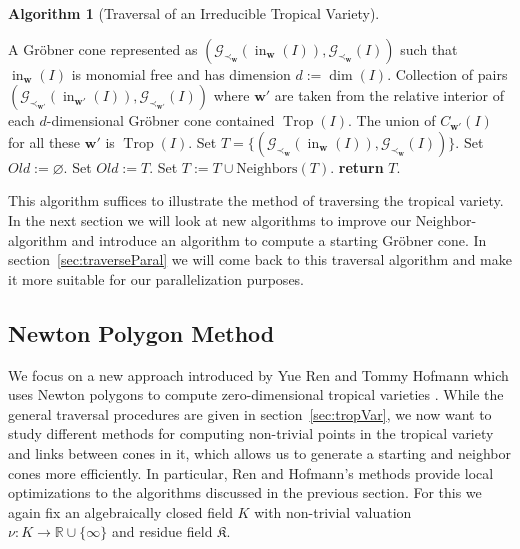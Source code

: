 \documentclass[
  paper=a4,
  titlepage,
  bibliography=totoc,
  listof=totoc,
  pagesize=pdftex
]{scrartcl}
\numberwithin{figure}{section}
\numberwithin{equation}{section}
\numberwithin{table}{section}
\newcommand*\setR{\mathds{R}}
\let\vec\mathbf
\DeclareMathOperator{\Trop}{Trop}
\DeclareMathOperator{\initial}{in}
\theoremstyle{definition}
\newtheorem{algo}[definition]{Algorithm}
\numberwithin{definition}{section}
\begin{document}
\begin{algo}[Traversal of an Irreducible Tropical Variety]\
  \label{alg:traversal}
  \begin{algorithmic}[1]
    \Require A Gröbner cone represented as $(\mathcal G_{\prec_{\vec w}}(\initial_{\vec
      w}(I)), \mathcal G_{\prec_{\vec w}}(I))$ such that $\initial_{\vec w}(I)$ is
      monomial free and has dimension $d:=\dim(I)$.
    \Ensure Collection of pairs $(\mathcal G_{\prec_{\vec w'}}(\initial_{\vec
      w'}(I)), \mathcal G_{\prec_{\vec w'}}(I))$ where $\vec w'$ are taken from the
      relative interior of each $d$-dimensional Gröbner cone contained $\Trop(I)$. The
      union of $C_{\vec w'}(I)$ for all these $\vec w'$ is $\Trop(I)$.
    \State Set $T = \{ (\mathcal G_{\prec_{\vec w}}(\initial_{\vec
      w}(I)), \mathcal G_{\prec_{\vec w}}(I)) \}$.
    \State Set $Old := \varnothing$.
      \State Set $Old := T$.
      \State Set $T := T \cup \mathrm{Neighbors}(T)$.
    \EndWhile
    \State\textbf{return} $T$.
  \end{algorithmic}
\end{algo}

This algorithm suffices to illustrate the method of traversing the tropical variety. In
the next section we will look at new algorithms to improve our Neighbor-algorithm and
introduce an algorithm to compute a starting Gröbner cone. In
section~\ref{sec:traverseParal} we will come back to this traversal algorithm and make it
more suitable for our parallelization purposes.

\subsection{Newton Polygon Method}
\label{sec:newtonMethod}

We focus on a new approach introduced by Yue Ren and Tommy Hofmann which uses Newton
polygons to compute zero-dimensional tropical varieties \cite{tropPointsLinks}. While the
general traversal procedures are given in section~\ref{sec:tropVar}, we now want to study
different methods for computing non-trivial points in the tropical variety and links
between cones in it, which allows us to generate a starting and neighbor cones more
efficiently. In particular, Ren and Hofmann's methods provide local optimizations to the
algorithms discussed in the previous section. For this we again fix an algebraically
closed field $K$ with non-trivial valuation $\nu:K\to\setR \cup \{\infty\}$ and
residue field $\mathfrak K$.
\end{document}
